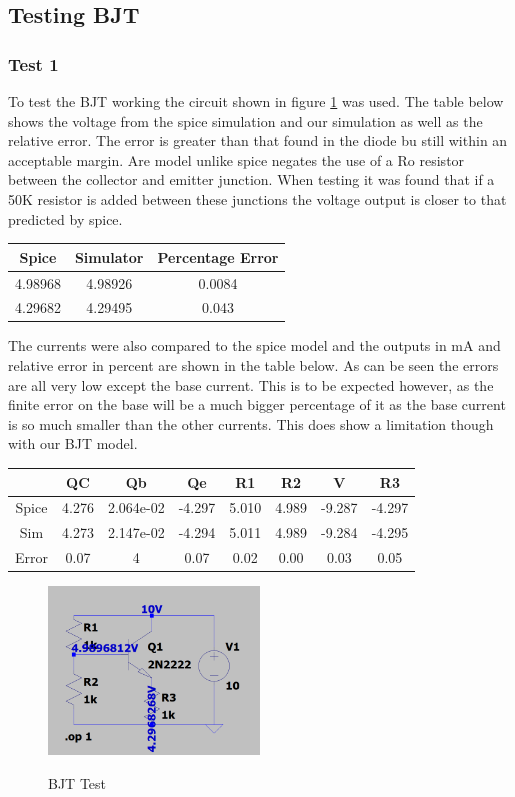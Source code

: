 \documentclass{article}
\begin{document}
\subsection{Testing BJT}
\subsubsection{Test 1}
To test the BJT working the circuit shown in figure \ref{fig:BJTTest1} was used. The table below shows the voltage from the spice simulation and our simulation as well as the relative error. The error is greater than that found in the diode bu still within an acceptable margin. Are model unlike spice negates the use of a Ro resistor between the collector and emitter junction. When testing it was found that if a 50K resistor is added between these junctions the voltage output is closer to that predicted by spice. 
\begin{center}
\begin{tabular}{ ||c| c ||c ||}
\hline
 Spice & Simulator & Percentage Error \\ 
 \hline
 4.98968 & 4.98926 & 0.0084 \\  
 4.29682 & 4.29495 & 0.043 \\   
 \hline
\end{tabular}
\end{center}
The currents were also compared to the spice model and the outputs in mA and relative error in percent are shown in the table below. As can be seen the errors are all very low except the base current. This is to be expected however, as the finite error on the base will be a much bigger percentage of it as the base current is so much smaller than the other currents. This does show a limitation though with our BJT model. 
\begin{center}
\begin{tabular}{ ||c| c |c |c | c| c| c| c ||}
\hline
  & QC & Qb & Qe & R1 & R2 & V & R3 \\ 
  \hline
 Spice & 4.276 & 2.064e-02 & -4.297 & 5.010 & 4.989 & -9.287 & -4.297\\
 Sim & 4.273& 2.147e-02& -4.294& 5.011& 4.989& -9.284& -4.295  \\
 Error &  0.07& 4 & 0.07 & 0.02 & 0.00 & 0.03 & 0.05  \\   
 \hline
\end{tabular}
\end{center}
\begin{figure}[h]
    \caption{BJT Test}
    \centering
    \includegraphics[width=0.5\textwidth]{images/BJTTest1.png}
    \label{fig:BJTTest1}
\end{figure}
\end{document}
